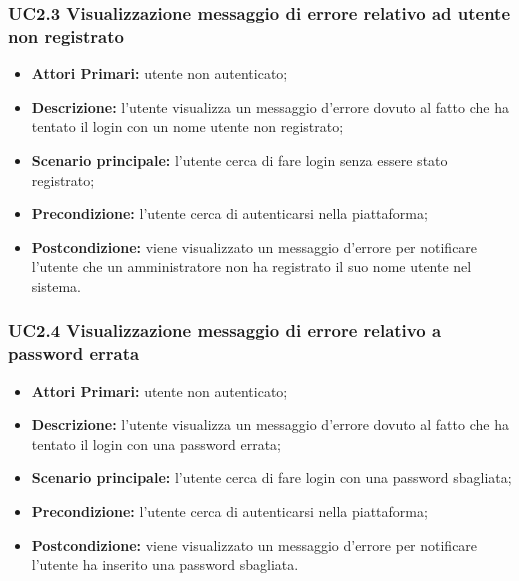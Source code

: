 \subsubsection{UC2.3 Visualizzazione messaggio di errore relativo ad utente non registrato}
\begin{itemize}
	\item \textbf{Attori Primari:} utente non autenticato;
	\item \textbf{Descrizione:} l'utente visualizza un messaggio d'errore dovuto al fatto che ha tentato il login con un nome utente non registrato;
	\item \textbf{Scenario principale:} l'utente cerca di fare login senza essere stato registrato;
	\item \textbf{Precondizione:} l'utente cerca di autenticarsi nella piattaforma;
	\item \textbf{Postcondizione:} viene visualizzato un messaggio d'errore per notificare l'utente che un amministratore non ha registrato il suo nome utente nel sistema.
\end{itemize}

\subsubsection{UC2.4 Visualizzazione messaggio di errore relativo a password errata}
\begin{itemize}
	\item \textbf{Attori Primari:} utente non autenticato;
	\item \textbf{Descrizione:} l'utente visualizza un messaggio d'errore dovuto al fatto che ha tentato il login con una password errata;
	\item \textbf{Scenario principale:} l'utente cerca di fare login con una password sbagliata;
	\item \textbf{Precondizione:} l'utente cerca di autenticarsi nella piattaforma;
	\item \textbf{Postcondizione:} viene visualizzato un messaggio d'errore per notificare l'utente ha inserito una password sbagliata.
\end{itemize}



